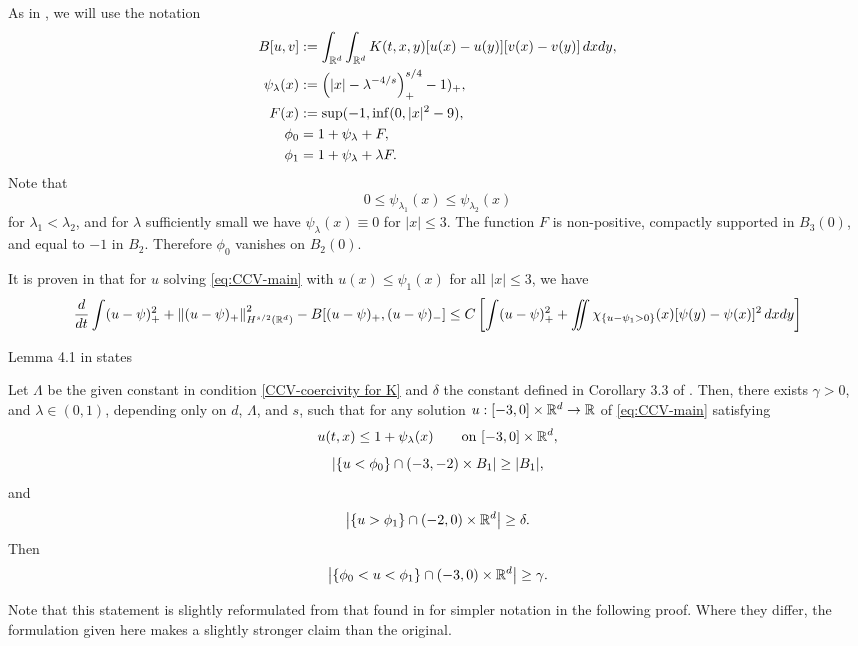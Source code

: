 As in \cite{CaChVa.nio}, we will use the notation
\begin{align*}
B[u,v] &:= \int_{\mathbb{R}^d} \int_{\mathbb{R}^d} K(t,x,y) [u(x)-u(y)] [v(x)-v(y)] \,dxdy, \\
\psi_\lambda(x) &:= \left( |x| - \lambda^{-4/s}  \right)_+^{s/4} - 1)_+, \\
F(x) &:= \sup(-1, \inf(0, |x|^2 - 9), \\
\phi_0 &= 1 + \psi_\lambda + F, \\
\phi_1 &= 1 + \psi_\lambda + \lambda F.
\end{align*}
Note that 
\[ 0 \leq \psi_{\lambda_1}(x) \leq \psi_{\lambda_2}(x) \]
for $\lambda_1 < \lambda_2$, and for $\lambda$ sufficiently small we have $\psi_\lambda(x) \equiv 0$ for $|x| \leq 3$.  The function $F$ is non-positive, compactly supported in $B_3(0)$, and equal to $-1$ in $B_2$.  Therefore $\phi_0$ vanishes on $B_2(0)$.  

It is proven in \cite{CaChVa.nio} that for $u$ solving \eqref{eq:CCV-main} with $u(x) \leq \psi_1(x)$ for all $|x|\leq 3$, we have
\begin{equation} \label{CCV-energy inequality generic}
\frac{d}{dt} \int (u - \psi)_+^2 + \left\lVert(u-\psi)_+\right\rVert^2_{H^{s/2}(\mathbb{R}^d)} - B[(u-\psi)_+,(u-\psi)_-] \leq C \left[ \int (u-\psi)_+^2 + \iint \chi_{\{u-\psi_1 > 0\}}(x)[\psi(y)-\psi(x)]^2 \,dxdy  \right]
\end{equation}



Lemma 4.1 in \cite{CaChVa.nio} states
\begin{lemma}
Let $\Lambda$ be the given constant in condition \eqref{CCV-coercivity for K} and $\delta$ the constant defined in Corollary 3.3 of \cite{CaChVa.nio}.  Then, there exists $\gamma > 0$, and $\lambda \in (0,1)$, depending only on $d$, $\Lambda$, and $s$, such that for any solution $u:[-3,0] \times \mathbb{R}^d \to \mathbb{R}$ of \eqref{eq:CCV-main} satisfying
\begin{equation} \label{CCV-pointwise bound}
u(t,x) \leq 1 + \psi_\lambda(x) \qquad \textrm{on } [-3,0]\times\mathbb{R}^d, 
\end{equation}
\[ \left\lvert \{u < \phi_0\} \cap (-3,-2)\times B_1 \right\rvert \geq |B_1|, \]
and
\[ \left\lvert \{u > \phi_1\} \cap (-2,0)\times \mathbb{R}^d \right\rvert \geq \delta. \]
Then
\[ \left\lvert \{\phi_0 < u < \phi_1\} \cap (-3,0)\times \mathbb{R}^d \right\rvert \geq \gamma. \]
\end{lemma}
Note that this statement is slightly reformulated from that found in \cite{CaChVa.nio} for simpler notation in the following proof.  Where they differ, the formulation given here makes a slightly stronger claim than the original.  

